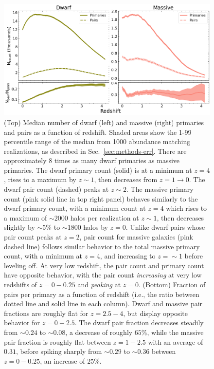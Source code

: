 \documentclass[twocolumn]{aastex631}
\begin{document}
  \begin{figure}[htp]
    \centering
    \includegraphics[width=\textwidth]{counts_1000.png}
    \caption{(Top) Median number of dwarf (left) and massive (right) primaries and pairs as a function of redshift.
    Shaded areas show the 1-99 percentile range of the median from 1000 abundance matching realizations, as described in Sec.~\ref{sec:methods-err}.
    There are approximately 8 times as many dwarf primaries as massive primaries. 
    The dwarf primary count (solid) is at a minimum at $z=4$, rises to a maximum by $z\sim1$, then decreases from $z=1\to0$. 
    The dwarf pair count (dashed) peaks at $z\sim2$.
    The massive primary count (pink solid line in top right panel) behaves similarly to the dwarf primary count, with a minimum count at $z=4$ which rises to a maximum of $\sim2000$ halos per realization at $z\sim1$, then decreases slightly by $\sim5\%$ to $\sim$1800 halos by $z=0$. 
    Unlike dwarf pairs whose pair count peaks at $z=2$, pair count for massive galaxies (pink dashed line) follows similar behavior to the total massive primary count, with a minimum at $z=4$, and increasing to $z=\sim 1$ before leveling off. At very low redshift, the pair count and primary count have opposite behavior, with the pair count \textit{increasing} at very low redshifts of $z=0-0.25$ and \textit{peaking} at $z=0$.
    (Bottom) Fraction of pairs per primary as a function of redshift (i.e., the ratio between dotted line and solid line in each column). Dwarf and massive pair fractions are roughly flat for $z=2.5-4$, but display opposite behavior for $z=0-2.5$. The dwarf pair fraction decreases steadily from $\sim0.24$ to $\sim0.08$, a decrease of roughly $65\%$, while the massive pair fraction is roughly flat between $z=1-2.5$ with an average of $0.31$, before spiking sharply from $\sim 0.29$ to $\sim 0.36$ between $z=0-0.25$, an increase of $25\%$.}
    \label{fig:counts}
  \end{figure}
\end{document}

